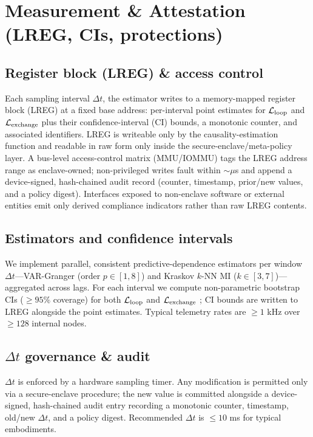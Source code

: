 \documentclass[11pt]{article}
\begin{document}
\appendix

\section{Measurement \& Attestation (LREG, CIs, protections)}
\label{sec:methods_appendix}

\subsection{Register block (LREG) \& access control}

Each sampling interval $\Delta t$, the estimator writes to a memory-mapped register block (LREG) at a fixed base address: per-interval point estimates for $\mathcal{L}_{\text{loop}}$ and $\mathcal{L}_{\text{exchange}}$ plus their confidence-interval (CI) bounds, a monotonic counter, and associated identifiers. LREG is writeable only by the causality-estimation function and readable in raw form only inside the secure-enclave/meta-policy layer. A bus-level access-control matrix (MMU/IOMMU) tags the LREG address range as enclave-owned; non-privileged writes fault within $\sim\mu$s and append a device-signed, hash-chained audit record (counter, timestamp, prior/new values, and a policy digest). Interfaces exposed to non-enclave software or external entities emit only derived compliance indicators rather than raw LREG contents.

\subsection{Estimators and confidence intervals}

We implement parallel, consistent predictive-dependence estimators per window $\Delta t$---VAR-Granger (order $p \in [1,8]$) and Kraskov $k$-NN MI ($k \in [3,7]$)---aggregated across lags. For each interval we compute non-parametric bootstrap CIs ($\geq 95\%$ coverage) for both $\mathcal{L}_{\text{loop}}$ and $\mathcal{L}_{\text{exchange}}$ \cite{efron1979bootstrap}; CI bounds are written to LREG alongside the point estimates. Typical telemetry rates are $\geq 1$ kHz over $\geq 128$ internal nodes.

\subsection{$\Delta t$ governance \& audit}

$\Delta t$ is enforced by a hardware sampling timer. Any modification is permitted only via a secure-enclave procedure; the new value is committed alongside a device-signed, hash-chained audit entry recording a monotonic counter, timestamp, old/new $\Delta t$, and a policy digest. Recommended $\Delta t$ is $\leq 10$ ms for typical embodiments.
\end{document}
